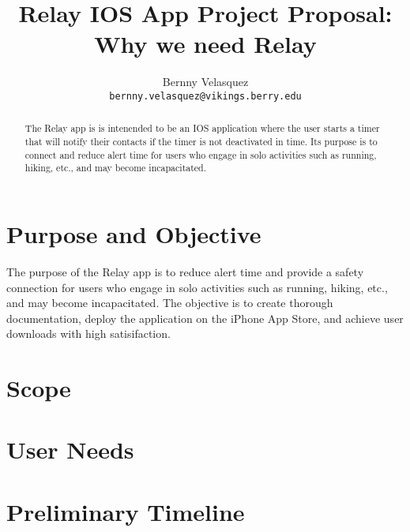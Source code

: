 \documentclass{article} %
\title{Relay IOS App Project Proposal: Why we need Relay}
\author{
Bernny Velasquez \\
\texttt{bernny.velasquez@vikings.berry.edu} \\
}
\begin{document}
\maketitle

\begin{abstract}
The Relay app is is intenended to be an IOS application where the user starts a timer that will notify their contacts if the timer is not deactivated in time. Its purpose is to connect and reduce alert time for users who engage in solo activities such as running, hiking, etc., and may become incapacitated. 

\end{abstract}

\section{Purpose and Objective}
The purpose of the Relay app is to reduce alert time and provide a safety connection for users who engage in solo activities such as running, hiking, etc., and may become incapacitated. The objective is to create thorough documentation, deploy the application on the iPhone App Store, and achieve user downloads with high satisifaction. 

\section{Scope}

\section{User Needs}


\section{Preliminary Timeline}









%
\end{document}
